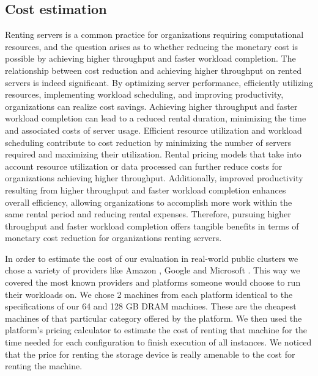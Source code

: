 \subsection{Cost estimation}
Renting servers is a common practice for organizations requiring
computational resources, and the question arises as to whether
reducing the monetary cost is possible by achieving higher throughput
and faster workload completion. The relationship between cost
reduction and achieving higher throughput on rented servers is indeed
significant. By optimizing server performance, efficiently utilizing
resources, implementing workload scheduling, and improving
productivity, organizations can realize cost savings. Achieving higher
throughput and faster workload completion can lead to a reduced rental
duration, minimizing the time and associated costs of server usage.
Efficient resource utilization and workload scheduling contribute to
cost reduction by minimizing the number of servers required and
maximizing their utilization. Rental pricing models that take into
account resource utilization or data processed can further reduce
costs for organizations achieving higher throughput. Additionally,
improved productivity resulting from higher throughput and faster
workload completion enhances overall efficiency, allowing
organizations to accomplish more work within the same rental period
and reducing rental expenses. Therefore, pursuing higher throughput
and faster workload completion offers tangible benefits in terms of
monetary cost reduction for organizations renting servers. 

In order to estimate the cost of our evaluation in real-world public clusters we
chose a variety of providers like Amazon \cite{EC2}, Google \cite{GCP} and Microsoft \cite{Azure}. This
way we covered the most known providers and platforms someone would
choose to run their workloads on. We chose 2 machines from each
platform identical to the specifications of our 64 and 128 GB DRAM
machines. These are the cheapest machines of that particular category
offered by the platform. We then used the platform's pricing
calculator to estimate the cost of renting that machine for the time
needed for each configuration to finish execution of all instances. We noticed that the price for
renting the storage device is really amenable to the cost for renting the machine.
